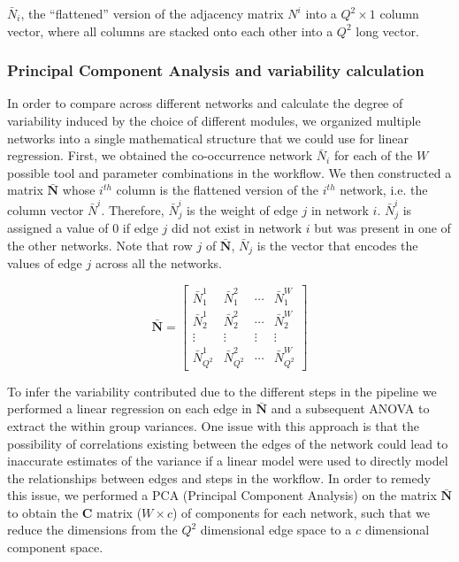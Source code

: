   $\bar{N}_i$, the ``flattened'' version of the adjacency matrix $N^i$ into a $Q^2 \times 1$ column vector, where all columns are stacked onto each other into a $Q^2$ long vector.


  \subsubsection*{Principal Component Analysis and variability calculation}
  \vspace{-5mm}
   In order to compare across different networks and calculate the degree of variability induced by the choice of different modules, we organized multiple networks into a single mathematical structure that we could use for linear regression.
   First, we obtained the co-occurrence network $\bar{N}_i$ for each of the $W$ possible tool and parameter combinations in the workflow.
   We then constructed a matrix $\mathbf{\bar{N}}$ whose $i^{th}$ column is the flattened version of the $i^{th}$ network, i.e. the column vector $\bar{N}^i$.
   Therefore, $\bar{N}^i_j$ is the weight of edge $j$ in network $i$.
   $\bar{N}^i_j$ is assigned a value of 0 if edge $j$ did not exist in network $i$ but was present in one of the other networks.
   Note that row $j$ of $\mathbf{\bar{N}}$, $\bar{N}_j$ is the vector that encodes the values of edge $j$ across all the networks.

  \begin{equation*}
   \mathbf{\bar{N}} =
      \begin{bmatrix}
       \bar{N}^1_1 & \bar{N}^2_1 & \cdots  & \bar{N}^{W}_1  \\
       \bar{N}^1_2 & \bar{N}^2_2 & \cdots  & \bar{N}^{W}_2 \\
       \vdots & \vdots & \vdots  & \vdots \\
       \bar{N}^1_{Q^2} & \bar{N}^2_{Q^2} & \cdots  & \bar{N}^{W}_{Q^2}
      \end{bmatrix}
  \end{equation*}

  To infer the variability contributed due to the different steps in the pipeline we performed a linear regression on each edge in $\mathbf{\bar{N}}$ and a subsequent ANOVA to extract the within group variances.
  One issue with this approach is that the possibility of correlations existing between the edges of the network could lead to inaccurate estimates of the variance if a linear model were used to directly model the relationships between edges and steps in the workflow.
  In order to remedy this issue, we performed a PCA (Principal Component Analysis) on the matrix $\mathbf{\bar{N}}$ to obtain the $\mathbf{C}$ matrix ($W \times c$) of components for each network, such that we reduce the dimensions from the $Q^2$ dimensional edge space to a $c$ dimensional component space.

